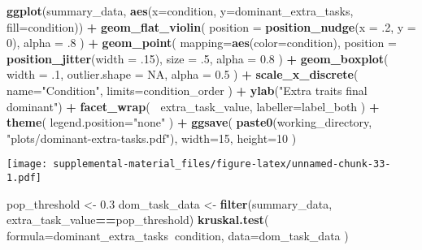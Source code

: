 \documentclass[]{book}
\newenvironment{Shaded}{\begin{snugshade}}{\end{snugshade}}
\newcommand{\DataTypeTok}[1]{\textcolor[rgb]{0.13,0.29,0.53}{#1}}
\newcommand{\DecValTok}[1]{\textcolor[rgb]{0.00,0.00,0.81}{#1}}
\newcommand{\FloatTok}[1]{\textcolor[rgb]{0.00,0.00,0.81}{#1}}
\newcommand{\KeywordTok}[1]{\textcolor[rgb]{0.13,0.29,0.53}{\textbf{#1}}}
\newcommand{\NormalTok}[1]{#1}
\newcommand{\OperatorTok}[1]{\textcolor[rgb]{0.81,0.36,0.00}{\textbf{#1}}}
\newcommand{\OtherTok}[1]{\textcolor[rgb]{0.56,0.35,0.01}{#1}}
\newcommand{\StringTok}[1]{\textcolor[rgb]{0.31,0.60,0.02}{#1}}
\begin{document}
\begin{Shaded}
\begin{Highlighting}[]
\KeywordTok{ggplot}\NormalTok{(summary_data, }\KeywordTok{aes}\NormalTok{(}\DataTypeTok{x=}\NormalTok{condition, }\DataTypeTok{y=}\NormalTok{dominant_extra_tasks, }\DataTypeTok{fill=}\NormalTok{condition)) }\OperatorTok{+}
\StringTok{  }\KeywordTok{geom_flat_violin}\NormalTok{(}
    \DataTypeTok{position =} \KeywordTok{position_nudge}\NormalTok{(}\DataTypeTok{x =} \FloatTok{.2}\NormalTok{, }\DataTypeTok{y =} \DecValTok{0}\NormalTok{),}
    \DataTypeTok{alpha =} \FloatTok{.8}
\NormalTok{  ) }\OperatorTok{+}
\StringTok{  }\KeywordTok{geom_point}\NormalTok{(}
    \DataTypeTok{mapping=}\KeywordTok{aes}\NormalTok{(}\DataTypeTok{color=}\NormalTok{condition),}
    \DataTypeTok{position =} \KeywordTok{position_jitter}\NormalTok{(}\DataTypeTok{width =} \FloatTok{.15}\NormalTok{),}
    \DataTypeTok{size =} \FloatTok{.5}\NormalTok{,}
    \DataTypeTok{alpha =} \FloatTok{0.8}
\NormalTok{  ) }\OperatorTok{+}
\StringTok{  }\KeywordTok{geom_boxplot}\NormalTok{(}
    \DataTypeTok{width =} \FloatTok{.1}\NormalTok{,}
    \DataTypeTok{outlier.shape =} \OtherTok{NA}\NormalTok{,}
    \DataTypeTok{alpha =} \FloatTok{0.5}
\NormalTok{  ) }\OperatorTok{+}
\StringTok{  }\KeywordTok{scale_x_discrete}\NormalTok{(}
    \DataTypeTok{name=}\StringTok{"Condition"}\NormalTok{,}
    \DataTypeTok{limits=}\NormalTok{condition_order}
\NormalTok{  ) }\OperatorTok{+}
\StringTok{  }\KeywordTok{ylab}\NormalTok{(}\StringTok{"Extra traits final dominant"}\NormalTok{) }\OperatorTok{+}
\StringTok{  }\KeywordTok{facet_wrap}\NormalTok{(}
    \OperatorTok{~}\NormalTok{extra_task_value,}
    \DataTypeTok{labeller=}\NormalTok{label_both}
\NormalTok{  ) }\OperatorTok{+}
\StringTok{  }\KeywordTok{theme}\NormalTok{(}
    \DataTypeTok{legend.position=}\StringTok{"none"}
\NormalTok{  ) }\OperatorTok{+}
\StringTok{  }\KeywordTok{ggsave}\NormalTok{(}
    \KeywordTok{paste0}\NormalTok{(working_directory, }\StringTok{"plots/dominant-extra-tasks.pdf"}\NormalTok{),}
    \DataTypeTok{width=}\DecValTok{15}\NormalTok{,}
    \DataTypeTok{height=}\DecValTok{10}
\NormalTok{  )}
\end{Highlighting}
\end{Shaded}

\texttt{[image: supplemental-material\_files/figure-latex/unnamed-chunk-33-1.pdf]}

\begin{Shaded}
\begin{Highlighting}[]
\NormalTok{pop_threshold <-}\StringTok{ }\FloatTok{0.3}
\NormalTok{dom_task_data <-}\StringTok{ }\KeywordTok{filter}\NormalTok{(summary_data, extra_task_value}\OperatorTok{==}\NormalTok{pop_threshold)}
\KeywordTok{kruskal.test}\NormalTok{(}
  \DataTypeTok{formula=}\NormalTok{dominant_extra_tasks}\OperatorTok{~}\NormalTok{condition,}
  \DataTypeTok{data=}\NormalTok{dom_task_data}
\NormalTok{)}
\end{Highlighting}
\end{Shaded}
\end{document}
